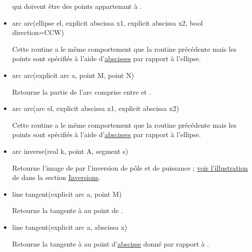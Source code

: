 \documentclass[pdftex]{article}
\begin{document}
\begin{itemize}
  qui doivent être des points appartenant à .\\
\item {}
  \begin{Vcolor}
    arc arc(ellipse el, explicit abscissa x1, explicit abscissa x2, bool direction=CCW)
  \end{Vcolor}
  Cette routine a le même comportement que la routine précédente mais
  les points sont spécifiés à l'aide
  d'\href{#section.abscissa}{abscisses} par rapport à l'ellipse.
\item {}
  \begin{Vcolor}
    arc arc(explicit arc a, point M, point N)
  \end{Vcolor}
  Retourne la partie de l'arc  comprise entre 
  et .
\item {}
  \begin{Vcolor}
    arc arc(arc el, explicit abscissa x1, explicit abscissa x2)
  \end{Vcolor}
  Cette routine a le même comportement que la routine précédente mais
  les points sont spécifiés à l'aide
  d'\href{#section.abscissa}{abscisses} par rapport à l'ellipse.
\item {}
  \begin{Vcolor}
    arc inverse(real k, point A, segment s)
  \end{Vcolor}
  Retourne l'image de  par l'inversion de pôle  et
  de puissance ; \href{#inversion_damier}{voir l'illustration}
  de\linebreak {} dans la section
  \href{#section.inversion}{Inversions}.
\item {}
  \begin{Vcolor}
    line tangent(explicit arc a, point M)
  \end{Vcolor}
  Retourne la tangente à  au point  de .
\item {}
  \begin{Vcolor}
    line tangent(explicit arc a, abscissa x)
  \end{Vcolor}
  Retourne la tangente à  au point
  d'\href{#section.abscissa}{abscisse}  donné par rapport
  à .
\end{itemize}
\end{document}
